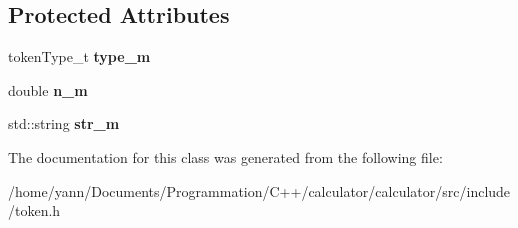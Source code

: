 \subsection*{Protected Attributes}
\begin{DoxyCompactItemize}
\item 
\hypertarget{class_token_a01979ac699ac624615570cf0ea1e5b71}{token\-Type\-\_\-t {\bfseries type\-\_\-m}}\label{class_token_a01979ac699ac624615570cf0ea1e5b71}

\item 
\hypertarget{class_token_ab5e62028b935156e5f69f3a50b20c078}{double {\bfseries n\-\_\-m}}\label{class_token_ab5e62028b935156e5f69f3a50b20c078}

\item 
\hypertarget{class_token_a2781f7d67fae2fa1cbfe4af5caf8473d}{std\-::string {\bfseries str\-\_\-m}}\label{class_token_a2781f7d67fae2fa1cbfe4af5caf8473d}

\end{DoxyCompactItemize}


The documentation for this class was generated from the following file\-:\begin{DoxyCompactItemize}
\item 
/home/yann/\-Documents/\-Programmation/\-C++/calculator/calculator/src/include/token.\-h\end{DoxyCompactItemize}
